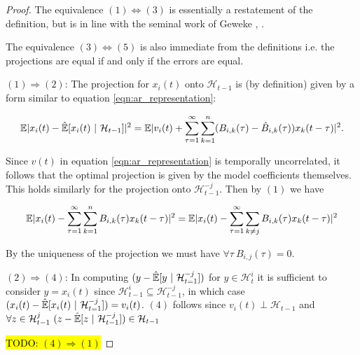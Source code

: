 \documentclass[12pt]{article}
\def\H{\mathcal{H}}  %
\newcommand{\linE}[2]{\hat{\E}[#1\ |\ #2]}  %
\begin{document}
\begin{proof}
  The equivalence $(1) \iff (3)$ is essentially a restatement of the
  definition, but is in line with the seminal work of Geweke
  \cite{geweke1982measurement}, \cite{geweke1984}.

  The equivalence $(3) \iff (5)$ is also immediate from the
  definitions i.e. the projections are equal if and only if the errors
  are equal.

  $(1) \Rightarrow (2)$: The projection for $x_i(t)$ onto $\H_{t - 1}$ is
  (by definition) given by a form similar to equation
  \ref{eqn:ar_representation}:

\[
  \E|x_i(t) - \linE{x_i(t)}{\H_{t - 1}}|^2 = \E|v_i(t) + \sum_{\tau = 1}^\infty \sum_{k = 1}^n (B_{i, k}(\tau) - \hat{B}_{i, k}(\tau))x_k(t - \tau)|^2.
\]

Since $v(t)$ in equation \ref{eqn:ar_representation} is temporally
uncorrelated, it follows that the optimal projection is given by the
model coefficients themselves.  This holds similarly for the
projection onto $\H_{t - 1}^{-j}$.  Then by $(1)$ we have

\[
  \mathbb{E}|x_i(t) - \sum_{\tau = 1}^\infty \sum_{k = 1}^n B_{i, k}(\tau)x_k(t - \tau)|^2 = \mathbb{E}|x_i(t) - \sum_{\tau = 1}^\infty\sum_{k \ne j}B_{i, k}(\tau)x_k(t - \tau)|^2
\]

By the uniqueness of the projection we must have
$\forall \tau\ B_{i, j}(\tau) = 0$.

$(2) \Rightarrow (4)$: In computing $(y - \linE{y}{\H_{t = 1}^{-j}})$ for
$y \in \H_t^i$ it is sufficient to consider $y = x_i(t)$ since
$\H_{t - 1}^i \subseteq \H_{t - 1}^{-j}$, in which case
$(x_i(t) - \linE{x_i(t)}{\H_{t = 1}^{-j}}) = v_i(t)$.  $(4)$ follows
since $v_i(t) \perp \H_{t - 1}$ and
$\forall z \in \H_{t - 1}^j\ (z - \linE{z}{\H_{t - 1}^{-j}}) \in \H_{t
  - 1}$

\hl{TODO: $(4) \Rightarrow (1)$}
  
\end{proof}



\end{document}
